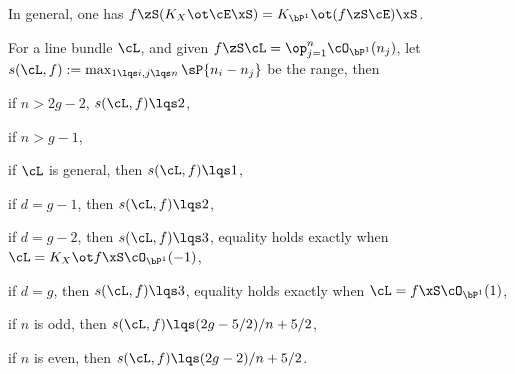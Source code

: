\documentclass[article, a4paper, twoside]{universal}
\begin{document}
\begin{thm}
	In general, one has $f\zS(K_{X}\ot\cE\xS)=K_{\bP^{1}}\ot(f\zS\cE)\xS$.

	For a line bundle $\cL$, and given $f\zS\cL=\op_{j=1}^{n}\cO_{\bP^{1}}(n_{j})$, let $s(\cL,f):=\max_{1\lqs i,j\lqs n}\sP{n_{i}-n_{j}}$ be the range, then
	\begin{itm}
		\item if $n>2g-2$, $s(\cL,f)\lqs2$,
		\item if $n>g-1$,
		\begin{itm}
			\item if $\cL$ is general, then $s(\cL,f)\lqs1$,
			\item if $d=g-1$, then $s(\cL,f)\lqs2$,
			\item if $d=g-2$, then $s(\cL,f)\lqs3$, equality holds exactly when $\cL=K_{X}\ot f\xS\cO_{\bP^{1}}(-1)$,
			\item if $d=g$, then $s(\cL,f)\lqs3$, equality holds exactly when $\cL=f\xS\cO_{\bP^{1}}(1)$,
		\end{itm}
		\item if $n$ is odd, then $s(\cL,f)\lqs (2g-5/2)/n+5/2$,
		\item if $n$ is even, then $s(\cL,f)\lqs(2g-2)/n+5/2$.
	\end{itm}
\end{thm}


\printref
\end{document}
